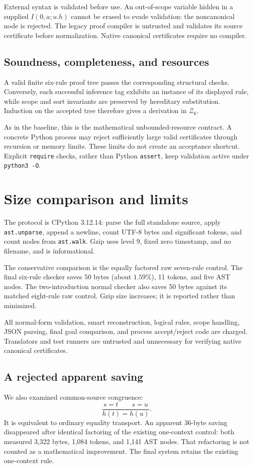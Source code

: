 \documentclass[11pt]{article}
\newcommand{\Zsix}{\mathcal Z_6}
\newcommand{\code}[1]{\nolinkurl{#1}}
\begin{document}
External syntax is validated before use. An out-of-scope variable
hidden in a supplied \(I(0,a;u.h)\) cannot be erased to evade validation:
the noncanonical node is rejected. The legacy proof compiler is
untrusted and validates its source certificate before normalization.
Native canonical certificates require no compiler.

\subsection{Soundness, completeness, and resources}
A valid finite six-rule proof tree passes the corresponding structural
checks. Conversely, each successful inference tag exhibits an instance
of its displayed rule, while scope and sort invariants are preserved
by hereditary substitution. Induction on the accepted tree therefore
gives a derivation in \(\Zsix\).

As in the baseline, this is the mathematical unbounded-resource
contract. A concrete Python process may reject sufficiently large
valid certificates through recursion or memory limits. These limits
do not create an acceptance shortcut.
Explicit \code{require} checks, rather than Python \code{assert},
keep validation active under \code{python3 -O}.

\section{Size comparison and limits}\label{sec:size}
The protocol is CPython 3.12.14: parse the full standalone source,
apply \code{ast.unparse}, append a newline, count UTF-8 bytes and
significant tokens, and count nodes from \code{ast.walk}.
Gzip uses level 9, fixed zero timestamp, and no filename, and is
informational.


The conservative comparison is the equally factored raw seven-rule
control. The final six-rule checker saves 50 bytes (about \(1.59\%\)),
11 tokens, and five AST nodes. The two-introduction normal checker
also saves 50 bytes against its matched eight-rule raw control.
Gzip size increases; it is reported rather than minimized.

All normal-form validation, smart reconstruction, logical rules,
scope handling, JSON parsing, final goal comparison, and process
accept/reject code are charged. Translators and test runners are
untrusted and unnecessary for verifying native canonical certificates.

\subsection{A rejected apparent saving}
We also examined common-source congruence:
\[
                      \frac{s=t\qquad s=u}{h(t)=h(u)}.
\]
It is equivalent to ordinary equality transport. An apparent 36-byte
saving disappeared after identical factoring of the existing
one-context control: both measured 3,322 bytes, 1,084 tokens, and
1,141 AST nodes. That refactoring is not counted as a mathematical
improvement. The final system retains the existing one-context rule.
\end{document}
